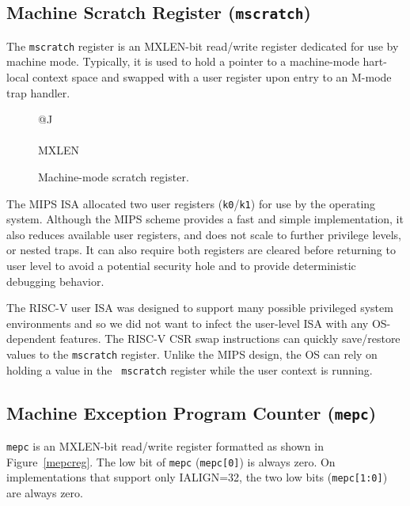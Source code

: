 \subsection{Machine Scratch Register ({\tt mscratch})}

The {\tt mscratch} register is an MXLEN-bit read/write register
dedicated for use by machine mode.  Typically, it is used to hold a
pointer to a machine-mode hart-local context space and swapped with a
user register upon entry to an M-mode trap handler.

\begin{figure}[h!]
{\footnotesize
\begin{center}
\begin{tabular}{@{}J}
 \\
\hline
{} \\
\hline
MXLEN \\
\end{tabular}
\end{center}
}
\vspace{-0.1in}
\caption{Machine-mode scratch register.}
\label{mscratchreg}
\end{figure}

\begin{commentary}
The MIPS ISA allocated two user registers ({\tt k0}/{\tt k1}) for use
by the operating system.  Although the MIPS scheme provides a fast and
simple implementation, it also reduces available user registers,  and
does not scale to further privilege levels, or nested traps.  It can
also require both registers are cleared before returning to user level
to avoid a potential security hole and to provide deterministic
debugging behavior.

The RISC-V user ISA was designed to support many possible privileged
system environments and so we did not want to infect the user-level
ISA with any OS-dependent features.  The RISC-V CSR swap instructions
can quickly save/restore values to the {\tt mscratch} register.
Unlike the MIPS design, the OS can rely on holding a value in the {\tt
  mscratch} register while the user context is running.
\end{commentary}

\subsection{Machine Exception Program Counter ({\tt mepc})}

{\tt mepc} is an MXLEN-bit read/write register formatted as shown in
Figure~\ref{mepcreg}.  The low bit of {\tt mepc} ({\tt mepc[0]}) is
always zero.  On implementations that support only IALIGN=32, the two low bits
({\tt mepc[1:0]}) are always zero.

